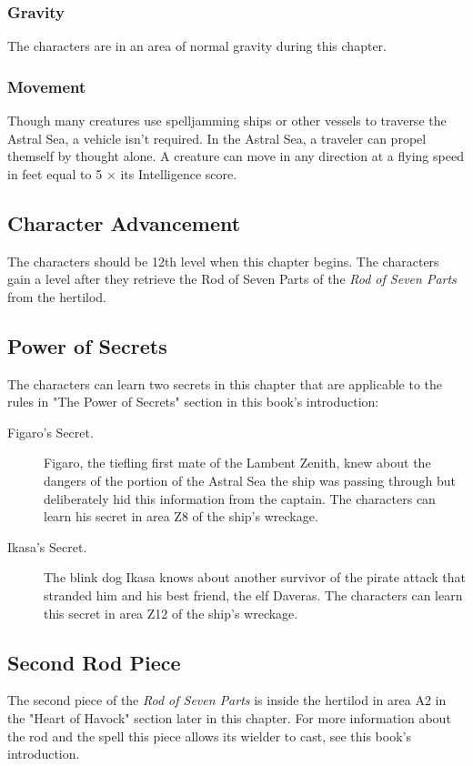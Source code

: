 \documentclass[10pt,a4paper,twoside,bg=print,twocolumn,openany,nodeprecatedcode]{dndbook}
\begin{document}
\subsubsection{Gravity}
The characters are in an area of normal gravity during this chapter.

\subsubsection{Movement}
Though many creatures use spelljamming ships or other vessels to traverse the Astral Sea, a vehicle isn't required. In the Astral Sea, a traveler can propel themself by thought alone. A creature can move in any direction at a flying speed in feet equal to 5 × its Intelligence score.

\subsection{Character Advancement}
The characters should be 12th level when this chapter begins. The characters gain a level after they retrieve the Rod of Seven Parts of the \textit{Rod of Seven Parts} from the hertilod.

\subsection{Power of Secrets}
The characters can learn two secrets in this chapter that are applicable to the rules in "The Power of Secrets" section in this book's introduction:


\begin{description}
\item[Figaro's Secret.]
Figaro, the tiefling first mate of the Lambent Zenith, knew about the dangers of the portion of the Astral Sea the ship was passing through but deliberately hid this information from the captain. The characters can learn his secret in area Z8 of the ship's wreckage.
\item[Ikasa's Secret.]
The blink dog Ikasa knows about another survivor of the pirate attack that stranded him and his best friend, the elf Daveras. The characters can learn this secret in area Z12 of the ship's wreckage.
\end{description}

\subsection{Second Rod Piece}
The second piece of the \textit{Rod of Seven Parts} is inside the hertilod in area A2 in the "Heart of Havock" section later in this chapter. For more information about the rod and the spell this piece allows its wielder to cast, see this book's introduction.
\end{document}

